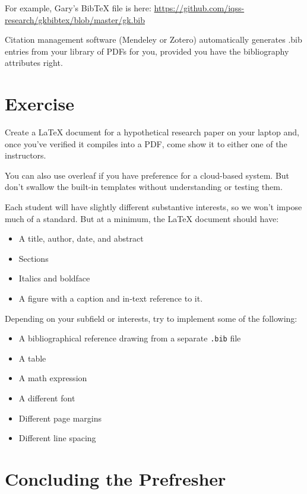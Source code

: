 \documentclass[]{book}
\providecommand{\tightlist}{%
  \setlength{\itemsep}{0pt}\setlength{\parskip}{0pt}}
\theoremstyle{definition}
\theoremstyle{definition}
\theoremstyle{definition}
\theoremstyle{remark}
\begin{document}
For example, Gary's BibTeX file is here:
\url{https://github.com/iqss-research/gkbibtex/blob/master/gk.bib}

Citation management software (Mendeley or Zotero) automatically
generates .bib entries from your library of PDFs for you, provided you
have the bibliography attributes right.

\section*{Exercise}\label{exercise}

Create a LaTeX document for a hypothetical research paper on your laptop
and, once you've verified it compiles into a PDF, come show it to either
one of the instructors.

You can also use overleaf if you have preference for a cloud-based
system. But don't swallow the built-in templates without understanding
or testing them.

Each student will have slightly different substantive interests, so we
won't impose much of a standard. But at a minimum, the LaTeX document
should have:

\begin{itemize}
\tightlist
\item
  A title, author, date, and abstract
\item
  Sections
\item
  Italics and boldface
\item
  A figure with a caption and in-text reference to it.
\end{itemize}

Depending on your subfield or interests, try to implement some of the
following:

\begin{itemize}
\tightlist
\item
  A bibliographical reference drawing from a separate \texttt{.bib} file
\item
  A table
\item
  A math expression
\item
  A different font
\item
  Different page margins
\item
  Different line spacing
\end{itemize}

\section*{Concluding the Prefresher}\label{concluding-the-prefresher}
\end{document}
